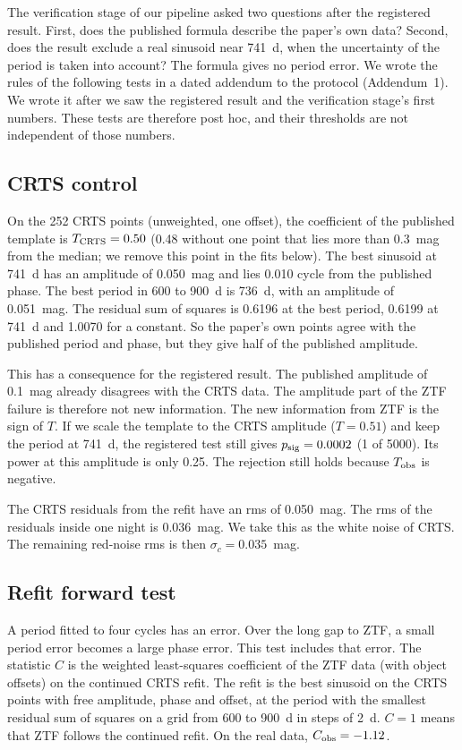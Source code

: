 \documentclass[11pt]{article}
\newcommand{\Tobs}{T_{\rm obs}}
\newcommand{\Cobs}{C_{\rm obs}}
\newcommand{\psig}{p_{\rm sig}}
\begin{document}
The verification stage of our pipeline asked two questions after the registered result. First, does the published formula describe the paper's own data? Second, does the result exclude a real sinusoid near 741~d, when the uncertainty of the period is taken into account? The formula gives no period error. We wrote the rules of the following tests in a dated addendum to the protocol (Addendum~1). We wrote it after we saw the registered result and the verification stage's first numbers. These tests are therefore post hoc, and their thresholds are not independent of those numbers.

\subsection{CRTS control}

On the 252 CRTS points (unweighted, one offset), the coefficient of the published template is $T_{\rm CRTS} = 0.50$ (0.48 without one point that lies more than 0.3~mag from the median; we remove this point in the fits below). The best sinusoid at 741~d has an amplitude of 0.050~mag and lies 0.010 cycle from the published phase. The best period in 600 to 900~d is 736~d, with an amplitude of 0.051~mag. The residual sum of squares is 0.6196 at the best period, 0.6199 at 741~d and 1.0070 for a constant. So the paper's own points agree with the published period and phase, but they give half of the published amplitude.

This has a consequence for the registered result. The published amplitude of 0.1~mag already disagrees with the CRTS data. The amplitude part of the ZTF failure is therefore not new information. The new information from ZTF is the sign of $T$. If we scale the template to the CRTS amplitude ($T = 0.51$) and keep the period at 741~d, the registered test still gives $\psig = 0.0002$ (1 of 5000). Its power at this amplitude is only 0.25. The rejection still holds because $\Tobs$ is negative.

The CRTS residuals from the refit have an rms of 0.050~mag. The rms of the residuals inside one night is 0.036~mag. We take this as the white noise of CRTS. The remaining red-noise rms is then $\sigma_c = 0.035$~mag.

\subsection{Refit forward test}

A period fitted to four cycles has an error. Over the long gap to ZTF, a small period error becomes a large phase error. This test includes that error. The statistic $C$ is the weighted least-squares coefficient of the ZTF data (with object offsets) on the continued CRTS refit. The refit is the best sinusoid on the CRTS points with free amplitude, phase and offset, at the period with the smallest residual sum of squares on a grid from 600 to 900~d in steps of 2~d. $C = 1$ means that ZTF follows the continued refit. On the real data, $\Cobs = -1.12$.
\end{document}
